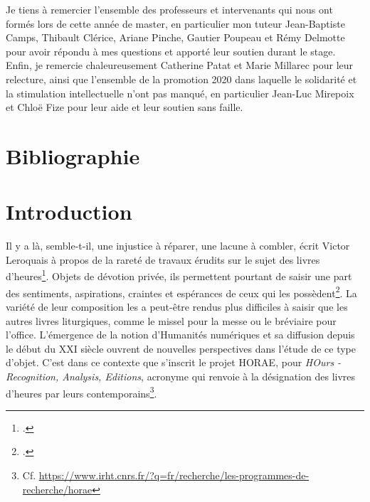 \documentclass[a4paper,12pt,twoside]{book}
\begin{document}
	Je tiens à remercier l'ensemble des professeurs et intervenants qui nous ont formés lors de cette année de master, en particulier mon tuteur Jean-Baptiste Camps, Thibault Clérice, Ariane Pinche, Gautier Poupeau et Rémy Delmotte pour avoir répondu à mes questions et apporté leur soutien durant le stage. \\
	
	Enfin, je remercie chaleureusement Catherine Patat et Marie Millarec pour leur relecture, ainsi que l'ensemble de la promotion 2020 dans laquelle le solidarité et la stimulation intellectuelle n'ont pas manqué, en particulier Jean-Luc Mirepoix et Chloë Fize pour leur aide et leur soutien sans faille. 

    \newpage
	\chapter*{Bibliographie}
	    \printbibliography[heading=subbibliography,keyword={MA},title={Manuscrits, livres d'heures, liturgie et dévotion au Moyen Âge}]	
	    \newpage
	     \printbibliography[heading=subbibliography,keyword={HN},title={Réflexions autour des Humanités numériques}]
	     \newpage
	     \printbibliography[heading=subbibliography,keyword={technologies},title={Normes, méthodes et pratiques numériques}]	
	
	
	\chapter*{Introduction}

	\og Il y a là, semble-t-il, une injustice à réparer, une lacune à combler\fg{}, écrit Victor Leroquais à propos de la rareté de travaux érudits sur le sujet des livres d'heures\footcite[p. II]{Leroquais_notices}. Objets de dévotion privée, ils permettent pourtant de saisir une part des sentiments, aspirations, craintes et espérances de ceux qui les possèdent\footcite[p. II]{Leroquais_notices}. La variété de leur composition les a peut-être rendus plus difficiles à saisir que les autres livres liturgiques, comme le missel pour la messe ou le bréviaire pour l'office. L'émergence de la notion d'\og Humanités numériques \fg{} et sa diffusion depuis le début du \textsc{XXI} siècle ouvrent de nouvelles perspectives dans l'étude de ce type d'objet. C'est dans ce contexte que s'inscrit le projet HORAE, pour \textit{HOurs - Recognition, Analysis, Editions}, acronyme qui renvoie à la désignation des livres d'heures par leurs contemporains\footnote{Cf. \url{https://www.irht.cnrs.fr/?q=fr/recherche/les-programmes-de-recherche/horae}}. \\
	
\end{document}
